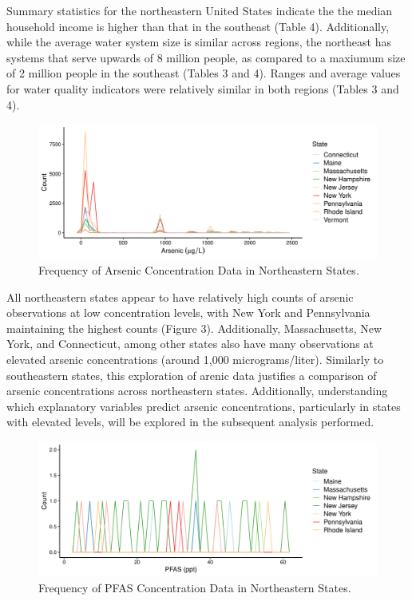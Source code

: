 \documentclass[12pt,]{article}
\begin{document}
Summary statistics for the northeastern United States indicate the the
median household income is higher than that in the southeast (Table 4).
Additionally, while the average water system size is similar across
regions, the northeast has systems that serve upwards of 8 million
people, as compared to a maxiumum size of 2 million people in the
southeast (Tables 3 and 4). Ranges and average values for water quality
indicators were relatively similar in both regions (Tables 3 and 4).

\begin{figure}
\centering
\includegraphics{Project_Template_files/figure-latex/figs3-1.pdf}
\caption{Frequency of Arsenic Concentration Data in Northeastern
States.}
\end{figure}

All northeastern states appear to have relatively high counts of arsenic
observations at low concentration levels, with New York and Pennsylvania
maintaining the highest counts (Figure 3). Additionally, Massachusetts,
New York, and Connecticut, among other states also have many
observations at elevated arsenic concentrations (around 1,000
micrograms/liter). Similarly to southeastern states, this exploration of
arenic data justifies a comparison of arsenic concentrations across
northeastern states. Additionally, understanding which explanatory
variables predict arsenic concentrations, particularly in states with
elevated levels, will be explored in the subsequent analysis performed.

\newpage

\begin{figure}
\centering
\includegraphics{Project_Template_files/figure-latex/figs4-1.pdf}
\caption{Frequency of PFAS Concentration Data in Northeastern States.}
\end{figure}
\end{document}
